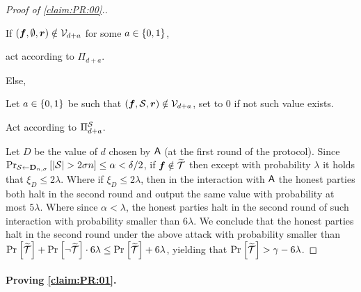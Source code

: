\begin{proof}[Proof of \cref{claim:PR:00}.]
{\begin{algorithm}[$\Ac$]
\begin{description}
			
			If $({ \boldsymbol{f}},\emptyset,{ \boldsymbol{r}}) \notin \mathcal{V}_{d+a}$ for some $a\in \{0,1\}$,
			
			\quad act  according to $\Pi_{d+a}$.
			
			
			Else,
			
			\quad Let $a\in \{0,1\}$ be such that  $({ \boldsymbol{f}},{\cal{S}},{ \boldsymbol{r}}) \notin \mathcal{V}_{d+a}$, set to $0$ if not such value exists.
			
			\quad Act  according to $\Pi^{{\cal{S}}}_{d+a}$.
			
	
\end{description}			
	\end{algorithm}
}

Let $D$ be the value of $d$  chosen by $\Ac$ (at the first round of the protocol).
Since $\Pr_{{\cal{S}} \gets \mathbf{D}_{n,\sigma}}\left[ \left|{\cal{S}}\right| > 2\sigma n\right] \le \alpha < \delta/2$,  if   ${ \boldsymbol{f}} \notin {\widetilde{\mathcal{T}}}$ then except with probability $\lambda$ it holds that  $\xi_D \le 2\lambda$.  Where  if $\xi_D \le 2\lambda$, then in the interaction with $\Ac$ the honest parties both halt in the second round and output the same value  with probability at most $5\lambda$. Where since $\alpha < \lambda$, the honest parties halt in the second round of such interaction with probability smaller than $6\lambda$. We conclude that the honest parties halt in the second round  under the above  attack with probability smaller than $\Pr_{}\left[{\widetilde{\mathcal{T}}}\right] + \Pr_{}\left[\neg {\widetilde{\mathcal{T}}}\right]\cdot   6\lambda \le \Pr_{}\left[{\widetilde{\mathcal{T}}}\right] +  6\lambda$, yielding that  $\Pr_{}\left[{\widetilde{\mathcal{T}}}\right] >    \gamma- 6\lambda$.
\end{proof}




\paragraph{Proving \cref{claim:PR:01}.}


\newcommand{\oH}{{\overline{\cH}}}

